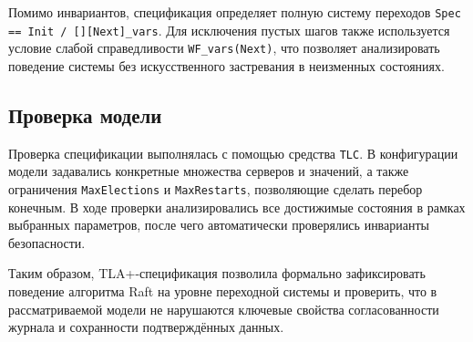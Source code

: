 Помимо инвариантов, спецификация определяет полную систему переходов
\texttt{Spec == Init /\ [][Next]\_vars}. Для исключения пустых шагов также
используется условие слабой справедливости \texttt{WF\_vars(Next)}, что
позволяет анализировать поведение системы без искусственного застревания в
неизменных состояниях.

\subsection{Проверка модели}

Проверка спецификации выполнялась с помощью средства \texttt{TLC}. В
конфигурации модели задавались конкретные множества серверов и значений, а
также ограничения \texttt{MaxElections} и \texttt{MaxRestarts}, позволяющие
сделать перебор конечным. В ходе проверки анализировались все достижимые
состояния в рамках выбранных параметров, после чего автоматически проверялись
инварианты безопасности.

Таким образом, TLA+-спецификация позволила формально зафиксировать поведение
алгоритма Raft на уровне переходной системы и проверить, что в рассматриваемой
модели не нарушаются ключевые свойства согласованности журнала и сохранности
подтверждённых данных.
